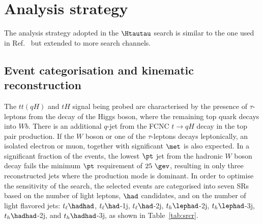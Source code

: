 \section{Analysis strategy}
\label{sec:strategy_Htautau}

The analysis strategy adopted in the $\Htautau$ search is similar to the one used in Ref.~\cite{fcnc36,Chen:2015nta} but extended to more search channels.

\subsection{Event categorisation and kinematic reconstruction}
\label{sec:htautau_reco_cat}

The $tt(qH)$ and $tH$ signal being probed are characterised by the presence of $\tau$-leptons from the decay of 
the Higgs boson, where the remaining top quark decays into $Wb$. There is an additional $q$-jet from the FCNC $t\to qH$ decay in the top pair production. 
If the $W$ boson or one of the $\tau$-leptons decays leptonically, an isolated electron or muon, together with significant $\met$ is also expected.
In a significant fraction of the events, the lowest $\pt$ jet from the hadronic $W$ boson decay fails the minimum $\pt$ requirement of $25~\gev$,
resulting in only three reconstructed jets where the production mode is dominant. 
In order to optimise the sensitivity of the search, the selected events are categorised into seven SRs based on the number of light leptons,
$\had$ candidates, and on the number of light flavored jets:
$t_{\ell}\hadhad$, $t_{\ell}\had$-1j, $t_{\ell}\had$-2j, $t_h\lephad$-2j, $t_h\lephad$-3j, $t_h\hadhad$-2j, and $t_h\hadhad$-3j, as shown in Table~\ref{tab:srcr}. 

